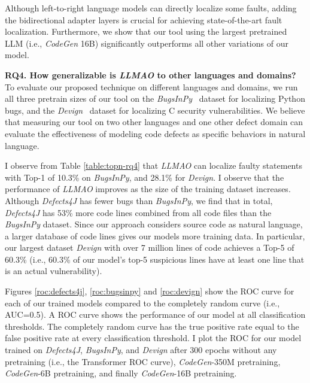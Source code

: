 \documentclass[12pt,openany,oneside,table]{cmuthesis}
\begin{document}
\begin{tcolorbox}
[colback=white,colframe=black,arc=0pt,boxrule=0.5pt,title=RQ3 Summary,boxsep=2pt,left=1pt,right=1pt,top=1pt,bottom=1pt,fonttitle=\bfseries]
Although left-to-right language models can directly localize some faults, adding the bidirectional adapter layers is crucial for achieving state-of-the-art fault localization. Furthermore, we show that our tool using the largest pretrained LLM (i.e., \textit{CodeGen} 16B) significantly outperforms all other variations of our model.
\vspace{0.5em}
\end{tcolorbox}

\noindent\textbf{RQ4. How generalizable is \textit{LLMAO} to other languages and domains?}
To evaluate our proposed technique on different languages and domains, we run all three pretrain sizes of our tool on the \textit{BugsInPy}~\cite{widyasari2020bugsinpy} dataset for localizing Python bugs, and the \textit{Devign}~\cite{zhou2019devign} dataset for localizing C security vulnerabilities. We believe that measuring our tool on two other languages and one other defect domain can evaluate the effectiveness of modeling code defects as specific behaviors in natural language. 

 I observe from Table \ref{table:topn-rq4} that \textit{LLMAO} can localize faulty statements with Top-1 of 10.3\% on \textit{BugsInPy}, and 28.1\% for \textit{Devign}. 
I observe that the performance of \textit{LLMAO} improves as the size of the training dataset increases. Although \textit{Defects4J} has fewer bugs than \textit{BugsInPy}, we find that in total, \textit{Defects4J} has 53\% more code lines combined from all code files than the \textit{BugsInPy} dataset. Since our approach considers source code as natural language, a larger database of code lines gives our models more training data. In particular, our largest dataset \textit{Devign} with over 7 million lines of code achieves a Top-5 of 60.3\% (i.e., 60.3\% of our model's top-5 suspicious lines have at least one line that is an actual vulnerability). 
    
Figures \ref{roc:defects4j}, \ref{roc:bugsinpy} and \ref{roc:devign} show the ROC curve for each of our trained models compared to the completely random curve (i.e., AUC=0.5).
A ROC curve shows the performance of our model at all classification thresholds. 
The completely random curve has the true positive rate equal to the false positive rate at every classification threshold.
I plot the ROC for our model trained on \textit{Defects4J}, \textit{BugsInPy}, and \textit{Devign} after 300 epochs without any pretraining (i.e., the Transformer ROC curve), \textit{CodeGen}-350M pretraining, \textit{CodeGen}-6B pretraining, and finally \textit{CodeGen}-16B pretraining. 
\end{document}
